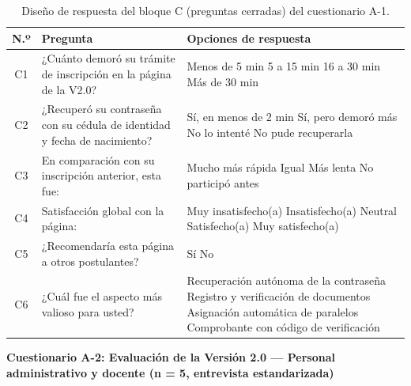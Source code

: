 \begin{table}[htbp]
    \centering
    \caption{Diseño de respuesta del bloque C (preguntas cerradas) del cuestionario A-1.}
    \label{tab:a1_cerradas}
    \begin{tabularx}{\textwidth}{c L L}
        \toprule
        \textbf{N.º} & \textbf{Pregunta} & \textbf{Opciones de respuesta} \\
        \midrule
        C1 & ¿Cuánto demoró su trámite de inscripción en la página de la V2.0? & \casilla{} Menos de 5 min \quad \casilla{} 5 a 15 min \quad \casilla{} 16 a 30 min \quad \casilla{} Más de 30 min \\
        C2 & ¿Recuperó su contraseña con su cédula de identidad y fecha de nacimiento? & \casilla{} Sí, en menos de 2 min \quad \casilla{} Sí, pero demoró más \quad \casilla{} No lo intenté \quad \casilla{} No pude recuperarla \\
        C3 & En comparación con su inscripción anterior, esta fue: & \casilla{} Mucho más rápida \quad \casilla{} Igual \quad \casilla{} Más lenta \quad \casilla{} No participó antes \\
        C4 & Satisfacción global con la página: & \casilla{} Muy insatisfecho(a) \quad \casilla{} Insatisfecho(a) \quad \casilla{} Neutral \quad \casilla{} Satisfecho(a) \quad \casilla{} Muy satisfecho(a) \\
        C5 & ¿Recomendaría esta página a otros postulantes? & \casilla{} Sí \quad \casilla{} No \\
        C6 & ¿Cuál fue el aspecto más valioso para usted? & \casilla{} Recuperación autónoma de la contraseña \quad \casilla{} Registro y verificación de documentos \quad \casilla{} Asignación automática de paralelos \quad \casilla{} Comprobante con código de verificación \\
        \bottomrule
    \end{tabularx}
\end{table}

\vspace{0.4cm}
\noindent\textbf{Cuestionario A-2: Evaluación de la Versión 2.0 --- Personal administrativo y docente (n = 5, entrevista estandarizada)}

